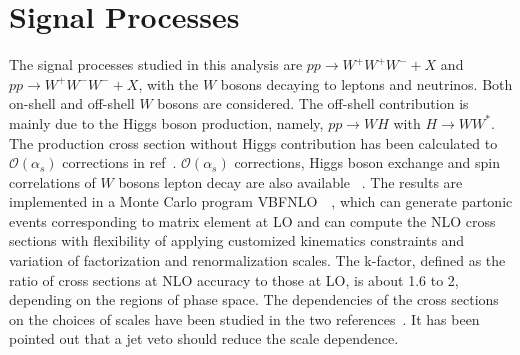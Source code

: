 \section{Signal Processes}
\label{sec:signal}
The signal processes studied in this analysis are $pp\rightarrow W^+W^+W^{-}+X$ and $pp\rightarrow
W^+W^-W^{-}+X$, with the $W$ bosons decaying to leptons and neutrinos.
Both on-shell and off-shell $W$ bosons are considered.  The off-shell
contribution is mainly due to the Higgs boson production, namely,
$pp\rightarrow WH$ with $H\rightarrow WW^*$.  The production cross
section without Higgs contribution has been calculated to $\mathcal{O}(\alpha_s)$  corrections in ref~\cite{Binoth:2008kt}.
$\mathcal{O}(\alpha_s)$ corrections, Higgs boson exchange and spin correlations of 
$W$ bosons lepton decay are also available
~\cite{Campanario:2008yg}.  The results are implemented in a Monte
Carlo program {\sc VBFNLO}~\cite{Arnold:2011wj}~\cite{Arnold:2012xn},
which can generate partonic events corresponding to matrix element at
LO and can compute the NLO cross sections with flexibility of applying
customized kinematics constraints and variation of factorization and
renormalization scales. The k-factor, defined as the ratio of cross
sections at NLO accuracy to those at LO, is about 1.6 to 2,
depending on the regions of phase space.  The dependencies of the cross
sections on the choices of scales have been studied in the two
references~\cite{Binoth:2008kt,Campanario:2008yg}. 
It has been pointed
out that a jet veto should reduce the scale dependence. 


